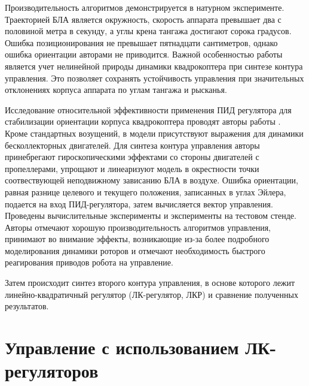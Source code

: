 Производительность алгоритмов демонстрируется в натурном эксперименте. Траекторией БЛА является окружность, скорость аппарата превышает два с половиной метра в секунду, а углы крена тангажа достигают сорока градусов. Ошибка позиционирования не превышает пятнадцати сантиметров, однако ошибка ориентации авторами не приводится. Важной особенностью работы является учет нелинейной природы динамики квадрокоптера при синтезе контура управления. Это позволяет сохранять устойчивость управления при значительных отклонениях корпуса аппарата по углам тангажа и рысканья.

Исследование относительной эффективности применения ПИД регулятора для стабилизации ориентации корпуса квадрокоптера проводят авторы работы \cite{Bouabdallah01}. Кроме стандартных возущений, в модели присутствуют выражения для динамики бесколлекторных двигателей. Для синтеза контура управления авторы принебрегают гироскопическими эффектами со стороны двигателей с пропеллерами, упрощают и линеаризуют модель в окрестности точки соотвествующей неподвижному зависанию БЛА в воздухе. Ошибка ориентации, равная разнице целевого и текущего положения, записанных в углах Эйлера, подается на вход ПИД-регулятора, затем вычисляется вектор управления. Проведены вычислительные эксперименты и эксперименты на тестовом стенде. Авторы отмечают хорошую производительность алгоритмов управления, принимают во внимание эффекты, возникающие из-за более подробного моделирования динамики роторов и отмечают необходимость быстрого реагирования приводов робота на управление.

Затем происходит синтез второго контура управления, в основе которого лежит линейно-квадратичный регулятор (ЛК-регулятор, ЛКР) и сравнение полученных результатов.
	

\section{Управление с использованием ЛК-регуляторов}

